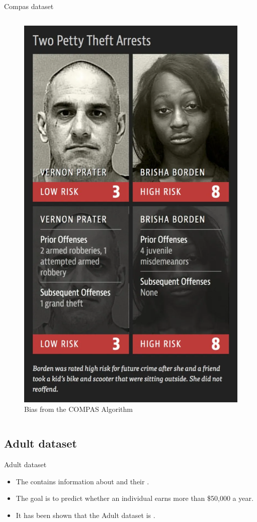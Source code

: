 \begin{frame}{Compas dataset}
\begin{columns}
\begin{column}{0.35\textwidth}
\begin{figure}
            \includegraphics[width=0.9\columnwidth]{images/compas.png}
            \caption{Bias from the COMPAS Algorithm}
            \label{fig:compas_dataset}
        \end{figure}
        \end{column}
    \end{columns}
    
\end{frame}

\subsection{Adult dataset}
\begin{frame}{Adult dataset}
        \begin{itemize}
            \item The  contains information about  and their .
            \item The goal is to predict whether an individual earns more than \$50,000 a year.
            \item It has been shown that the Adult dataset is .
        \end{itemize}
\end{frame}

